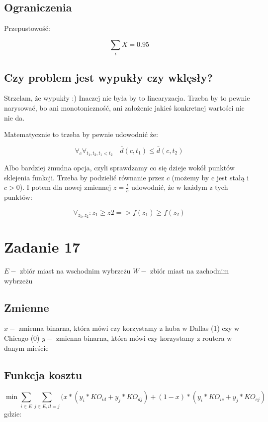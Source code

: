 \documentclass{article}
\begin{document}
\subsection{Ograniczenia}

Przepustowość:

\begin{equation}
  \sum_{i} X = 0.95
\end{equation}


\subsection{Czy problem jest wypukły czy wklęsły?}
Strzelam, że wypukły :) Inaczej nie była by to linearyzacja. Trzeba by to pewnie
narysować, bo ani monotoniczność, ani założenie jakieś konkretnej wartości nic nie da.

Matematycznie to trzeba by pewnie udowodnić że:

\begin{equation}
  \forall_{c} \forall_{t_1, t_2, t_1 < t_2} \quad \bar {d}(c, t_1) \leq \bar{d}(c, t_2)
\end{equation}

Albo bardziej żmudna opcja, czyli sprawdzamy co się dzieje wokół punktów sklejenia funkcji. Trzeba by podzielić równanie przez $c$ (możemy by c jest stałą i $c >0$).
I potem dla nowej zmiennej $z = \frac{t}{c}$ udowodnić, że w każdym z tych punktów:

\begin{equation}
    \forall_{z_1, z_2} : z_1 \geq z2 => f(z_1) \geq f(z_2)
\end{equation}

\section{Zadanie 17}

$E -$ zbiór miast na wschodnim wybrzeżu
$W -$ zbiór miast na zachodnim wybrzeżu



\subsection{Zmienne}

$x -$ zmienna binarna, która mówi czy korzystamy z huba w Dallas (1) czy w Chicago (0)
$y -$ zmienna binarna, która mówi czy korzystamy z routera w danym mieście

\subsection{Funkcja kosztu}
\begin{equation}
  \min \sum_{i \in E } \sum_{j \in E, i!=j}(x*(y_i * KO_{id} + y_j*KO_{dj}) + (1-x) * (y_i*KO_{ic} + y_j*KO_{cj})
\end{equation}
gdzie:
\end{document}
